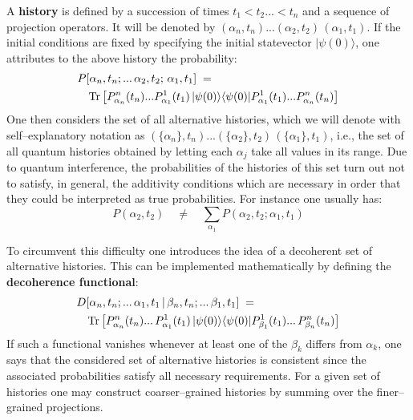 \documentclass[12pt]{article}
\begin{document}
A {\bf history} is defined by a succession of times $t_{1} < t_{2}
... < t_{n}$ and a sequence of projection operators. It will be
denoted by $(\alpha_{n},t_{n}) ... (\alpha_{2},t_{2})\,
(\alpha_{1},t_{1})$. If the initial conditions are fixed by
specifying the initial statevector $|\psi(0)\rangle$, one
attributes to the above history the probability:
\begin{eqnarray}
\lefteqn{P[\alpha_{n},t_{n}; ... \,\alpha_{2},t_{2};\,
\alpha_{1},t_{1}] \; = \;} \nonumber \\ && \makebox{Tr} \left[
P^{n}_{\alpha_{n}}(t_{n}) ...
P^{1}_{\alpha_{1}}(t_{1})\,|\psi(0)\rangle\langle\psi(0)|
P^{1}_{\alpha_{1}}(t_{1})... P^{n}_{\alpha_{n}}(t_{n})\right]
\end{eqnarray}
One then considers the set of all alternative histories, which we
will denote with self--explanatory notation as
$(\{\alpha_{n}\},t_{n}) ... (\{\alpha_{2}\},t_{2})\,
(\{\alpha_{1}\},t_{1})$, i.e., the set of all quantum histories
obtained by letting each $\alpha_{j}$ take all values in its
range. Due to quantum interference, the probabilities of the
histories of this set turn out not to satisfy, in general, the
additivity conditions which are necessary in order that they could
be interpreted as true probabilities. For instance one usually
has:
\begin{equation}
P(\alpha_{2}, t_{2}) \quad \neq \quad \sum_{\alpha_{1}}
P(\alpha_{2}, t_{2}; \alpha_{1}, t_{1})
\end{equation}

To circumvent this difficulty one introduces the idea of a
decoherent set of alternative histories. This can be implemented
mathematically by defining the {\bf decoherence functional}:
\begin{eqnarray}
\lefteqn{D[\alpha_{n},t_{n}; ...\, \alpha_{1},t_{1}\, |\,
\beta_{n},t_{n}; ...\, \beta_{1},t_{1}]
\; = \;} \nonumber \\
& & \makebox{Tr} \left[ P^{n}_{\alpha_{n}}(t_{n}) ...\,
P^{1}_{\alpha_{1}}(t_{1})\,|\psi(0)\rangle\langle\psi(0)|
P^{1}_{\beta_{1}}(t_{1})...\, P^{n}_{\beta_{n}}(t_{n})\right]
\end{eqnarray}
If such a functional vanishes whenever at least one of the
$\beta_{k}$ differs from $\alpha_{k}$, one says that the
considered set of alternative histories is consistent since the
associated probabilities satisfy all necessary requirements. For a
given set of histories one may construct coarser--grained
histories by summing over the finer--grained projections.
\end{document}
